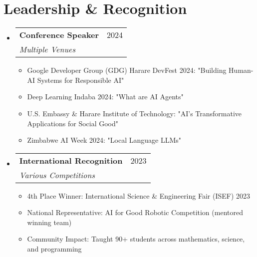 \documentclass[letterpaper,11pt]{article}
\makeatletter
\newcommand{\resumeItem}[1]{
  \item\small{
    {#1 \vspace{-2pt}}
  }
}
\newcommand{\resumeSubheading}[4]{
  \vspace{-2pt}\item
    \begin{tabular*}{0.97\textwidth}[t]{l@{\extracolsep{\fill}}r}
      \textbf{#1} & #2 \\
      \textit{\small#3} & \textit{\small #4} \\
    \end{tabular*}\vspace{-7pt}
}
\newcommand{\resumeSubHeadingListStart}{\begin{itemize}[leftmargin=0.15in, label={}]}
\newcommand{\resumeSubHeadingListEnd}{\end{itemize}}
\newcommand{\resumeItemListStart}{\begin{itemize}}
\newcommand{\resumeItemListEnd}{\end{itemize}\vspace{-5pt}}
\makeatother
\begin{document}
\section{Leadership \& Recognition}
  \resumeSubHeadingListStart
    \resumeSubheading
      {Conference Speaker}{2024}
      {Multiple Venues}{}
      \resumeItemListStart
        \resumeItem{Google Developer Group (GDG) Harare DevFest 2024: "Building Human-AI Systems for Responsible AI"}
        \resumeItem{Deep Learning Indaba 2024: "What are AI Agents"}
        \resumeItem{U.S. Embassy \& Harare Institute of Technology: "AI's Transformative Applications for Social Good"}
        \resumeItem{Zimbabwe AI Week 2024: "Local Language LLMs"}
      \resumeItemListEnd
    \resumeSubheading
      {International Recognition}{2023}
      {Various Competitions}{}
      \resumeItemListStart
        \resumeItem{4th Place Winner: International Science \& Engineering Fair (ISEF) 2023}
        \resumeItem{National Representative: AI for Good Robotic Competition (mentored winning team)}
        \resumeItem{Community Impact: Taught 90+ students across mathematics, science, and programming}
      \resumeItemListEnd
  \resumeSubHeadingListEnd


\end{document}
